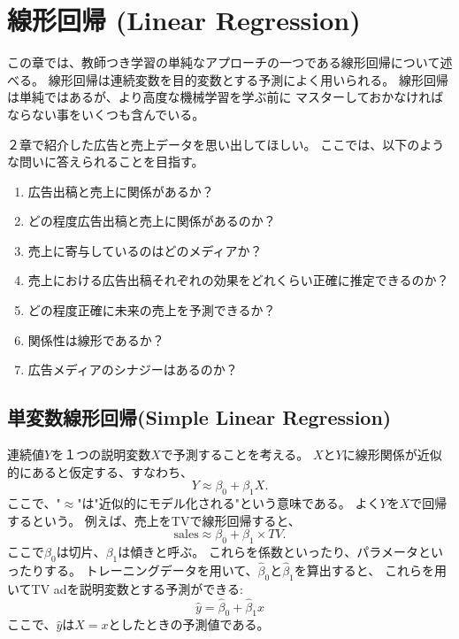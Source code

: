 \documentclass{jsbook}
\begin{document}
%
\setlength{\baselineskip}{2em} %
\setcounter{chapter}{2}
\chapter{線形回帰 (Linear Regression)}
この章では、教師つき学習の単純なアプローチの一つである線形回帰について述べる。
線形回帰は連続変数を目的変数とする予測によく用いられる。
線形回帰は単純ではあるが、より高度な機械学習を学ぶ前に
マスターしておかなければならない事をいくつも含んでいる。

２章で紹介した広告と売上データを思い出してほしい。
ここでは、以下のような問いに答えられることを目指す。
\begin{enumerate}
\item 広告出稿と売上に関係があるか？
\item どの程度広告出稿と売上に関係があるのか？
\item 売上に寄与しているのはどのメディアか？
\item 売上における広告出稿それぞれの効果をどれくらい正確に推定できるのか？
\item どの程度正確に未来の売上を予測できるか？
\item 関係性は線形であるか？
\item 広告メディアのシナジーはあるのか？
\end{enumerate}

\section{単変数線形回帰(Simple Linear Regression)}
連続値$Y$を１つの説明変数$X$で予測することを考える。
$X$と$Y$に線形関係が近似的にあると仮定する、すなわち、
\begin{equation}
Y \approx \beta_0 + \beta_1 X.
\end{equation}
ここで、"$\approx$"は"近似的にモデル化される"という意味である。
よく$Y$を$X$で回帰するという。
例えば、売上をTVで線形回帰すると、
$$\text{sales} \approx \beta_0 + \beta_1 \times TV.$$
ここで$\beta_0$は切片、$\beta_1$は傾きと呼ぶ。
これらを係数といったり、パラメータといったりする。
トレーニングデータを用いて、$\hat{\beta}_0$と$\hat{\beta}_1$を算出すると、
これらを用いてTV adを説明変数とする予測ができる:
\begin{equation}
	\hat{y} = \hat{\beta}_0 + \hat{\beta}_1 x
\end{equation}
ここで、$\hat{y}$は$X=x$としたときの予測値である。
\end{document}
